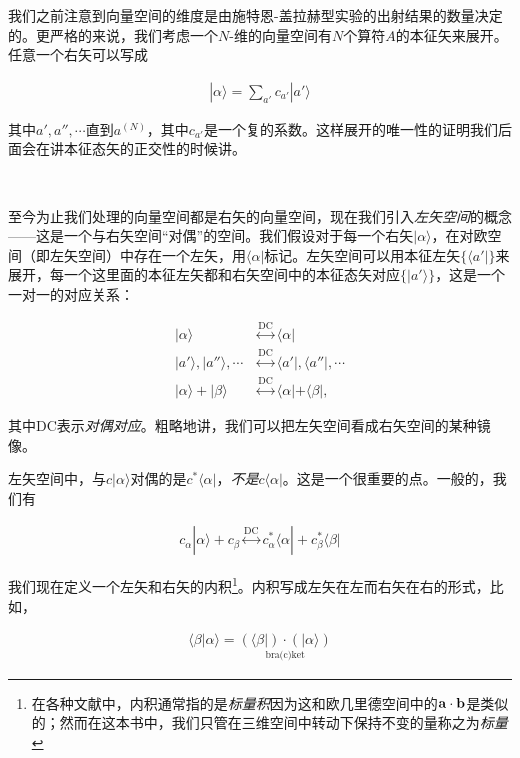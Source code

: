 \documentclass[UTF8,twoside]{ctexart}
\begin{document}
我们之前注意到向量空间的维度是由施特恩-盖拉赫型实验的出射结果的数量决定的。更严格的来说，我们考虑一个$N$-维的向量空间有$N$个算符$A$的本征矢来展开。任意一个右矢可以写成

\begin{align}
|\alpha\rangle = \sum_{a'}c_{a'}|a'\rangle
\end{align}

\noindent 其中$a', a'', \cdots$直到$a^{(N)}$，其中$c_{a'}$是一个复的系数。这样展开的唯一性的证明我们后面会在讲本征态矢的正交性的时候讲。

\ 


\noindent 至今为止我们处理的向量空间都是右矢的向量空间，现在我们引入{\emph{左矢空间}}的概念——这是一个与右矢空间“对偶”的空间。我们假设对于每一个右矢$|\alpha\rangle$，在对欧空间（即左矢空间）中存在一个左矢，用$\langle \alpha|$标记。左矢空间可以用本征左矢$\{\langle a'|\}$来展开，每一个这里面的本征左矢都和右矢空间中的本征态矢对应$\{|a'\rangle\}$，这是一个一对一的对应关系：

\begin{equation}
\begin{split}
|\alpha\rangle &\overset{\text{DC}}{\longleftrightarrow}\langle\alpha|\\
|a'\rangle, |a''\rangle, \cdots&\overset{\text{DC}}{\longleftrightarrow}\langle a'|,\langle a''|,\cdots\\
|\alpha\rangle + |\beta\rangle &\overset{\text{DC}}{\longleftrightarrow} \langle\alpha|+\langle\beta|,
\end{split}
\end{equation}

\noindent 其中DC表示\emph{对偶对应}。粗略地讲，我们可以把左矢空间看成右矢空间的某种镜像。

左矢空间中，与$c|\alpha\rangle$对偶的是$c^*\langle\alpha|$，\emph{不是}$c\langle\alpha|$。这是一个很重要的点。一般的，我们有

\begin{align}
c_{\alpha}|\alpha\rangle + c_{\beta}\overset{\text{DC}}{\longleftrightarrow}c_{\alpha}^*\langle\alpha|+c_{\beta}^*\langle\beta|
\end{align}

我们现在定义一个左矢和右矢的内积\footnote{在各种文献中，内积通常指的是\emph{标量积}因为这和欧几里德空间中的$\bf a\cdot b$是类似的；然而在这本书中，我们只管在三维空间中转动下保持不变的量称之为\emph{标量}}。内积写成左矢在左而右矢在右的形式，比如，

\begin{align}
\langle\beta|\alpha\rangle = \underset{\text{bra(c)ket}}{\displaystyle(\langle\beta|)\cdot(|\alpha\rangle)}
\end{align}
\end{document}
